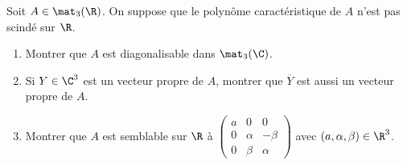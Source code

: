 \begin{enonce}
\begin{exercise}[ID={RMS 121-2 E828 Centrale PSI},subtitle={},tags={}, difficulty={0}]
Soit $A\in\mat_3(\R)$.
On suppose que le polynôme caractéristique de $A$ n'est pas scindé sur $\R$.
\begin{enumerate}
  \item Montrer que $A$ est diagonalisable dans $\mat_3(\C)$.
  \item Si $Y\in\C^3$ est un vecteur propre de $A$, montrer que $\overline{Y}$ est aussi un vecteur propre de $A$.
  \item Montrer que $A$ est semblable sur $\R$ à
    \begin{math}
      \begin{pmatrix}
      a & 0      & 0\\
      0 & \alpha & -\beta\\
      0 & \beta  & \alpha
      \end{pmatrix}
    \end{math}
    avec $(a,\alpha,\beta)\in\R^3$.
\end{enumerate}
\end{exercise}
\begin{solution}
\end{solution}
\end{enonce}
